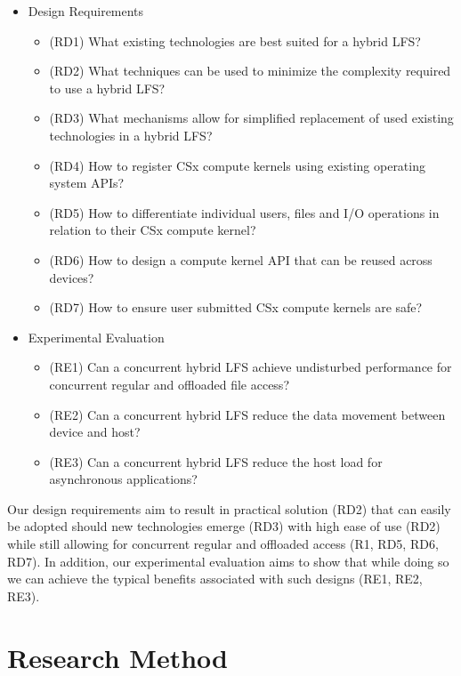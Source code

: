 \begin{itemize}
    \item Design Requirements
    \begin{itemize}
        \item (RD1) What existing technologies are best suited for a hybrid LFS?
        \item (RD2) What techniques can be used to minimize the complexity
              required to use a hybrid LFS?
        \item (RD3) What mechanisms allow for simplified replacement of used
              existing technologies in a hybrid LFS?
        \item (RD4) How to register CSx compute kernels using existing operating 
              system APIs?
        \item (RD5) How to differentiate individual users, files and I/O
              operations in relation to their CSx compute kernel?
        \item (RD6) How to design a compute kernel API that can be reused across
              devices?
        \item (RD7) How to ensure user submitted CSx compute kernels are safe?
    \end{itemize}
    \item Experimental Evaluation
    \begin{itemize}
        \item (RE1) Can a concurrent hybrid LFS achieve undisturbed performance
              for concurrent regular and offloaded file access?
        \item (RE2) Can a concurrent hybrid LFS reduce the data movement
              between device and host?
        \item (RE3) Can a concurrent hybrid LFS reduce the host load for
              asynchronous applications?
    \end{itemize}
\end{itemize}

Our design requirements aim to result in practical solution (RD2) that can
easily be adopted should new technologies emerge (RD3) with high ease of use
(RD2) while still allowing for concurrent regular and offloaded access
(R1, RD5, RD6, RD7). In addition, our experimental evaluation aims to show that
while doing so we can achieve the typical benefits associated with such designs
(RE1, RE2, RE3).

\section{Research Method}

